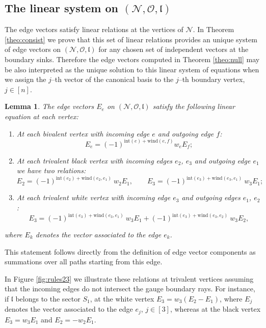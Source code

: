 \documentclass[11pt]{amsart}
\theoremstyle{plain}
\numberwithin{equation}{section}
\newtheorem{lemma}[theorem]{Lemma}
\begin{document}
\subsection{The linear system on $({\mathcal N},\mathcal O,\mathfrak l)$}\label{sec:linear}

The edge vectors satisfy linear relations at the vertices of ${\mathcal N}$. In Theorem \ref{theo:consist} we prove that this set of linear relations provides an unique system of edge vectors on $({\mathcal N},\mathcal O,\mathfrak l)$ for any chosen set of independent vectors at the boundary sinks. Therefore the edge vectors computed in Theorem \ref{theo:null} may be also interpreted as the unique solution to this linear system of equations when we assign the $j$--th vector of the canonical basis to the $j$--th boundary vertex, $j\in [n]$.

\begin{lemma}
\label{lem:relations}
The edge vectors $E_e$ on $({\mathcal N},\mathcal O,\mathfrak l)$ satisfy the following linear equation at each vertex:  
\begin{enumerate}
\item  At each bivalent vertex with incoming edge $e$ and outgoing edge $f$:
\begin{equation}\label{eq:lineq_biv}
E_e =  (-1)^{\mbox{int}(e)+\mbox{wind}(e,f)} w_e E_f;
\end{equation}
\item At each trivalent black vertex with incoming edges $e_2$, $e_3$ and outgoing edge $e_1$ we have two relations:
\begin{equation}\label{eq:lineq_black}
E_2 =  (-1)^{\mbox{int}(e_2)+\mbox{wind}(e_2, e_1)}\ w_2 E_1,\quad\quad
E_3 =  (-1)^{\mbox{int}(e_3)+\mbox{wind}(e_3, e_1)}\  w_3 E_1;
\end{equation}
\item At each trivalent white vertex with incoming edge $e_3$ and outgoing edges $e_1$, $e_2$:
\begin{equation}\label{eq:lineq_white}
E_3 =  (-1)^{\mbox{int}(e_3)+\mbox{wind}(e_3, e_1)}\ w_3 E_1 + (-1)^{\mbox{int}(e_3)+\mbox{wind}(e_3, e_2)}\ w_3 E_2,
\end{equation}
\end{enumerate}
where $E_k$ denotes the vector associated to the edge $e_k$.
\end{lemma}
This statement follows directly from the definition of edge vector components as summations over all paths starting from this edge.

In Figure \ref{fig:rules23} we illustrate these relations at trivalent vertices assuming that the incoming edges do not 
intersect the gauge boundary rays. For instance, if $\mathfrak l$ belongs to the sector $S_1$, at the white vertex $E_3 = w_3 ( E_2 -E_1)$, where $E_j$ denotes the vector associated to the edge $e_j$, $j\in [3]$, whereas at the black vertex $E_3= w_3 E_1$ and $E_2 =-w_2 E_1$.
\end{document}
